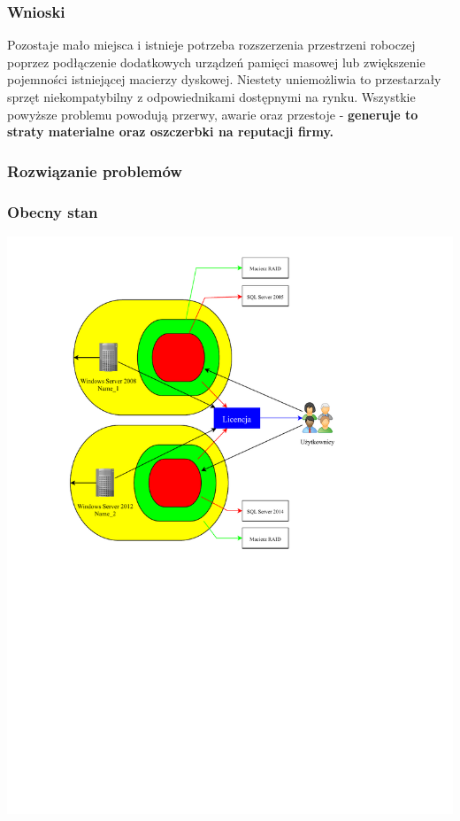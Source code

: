 \documentclass[a4paper, 12pt]{article}
\begin{document}
	  \subsubsection{Wnioski} 
	
			 	\hspace*{1cm} Pozostaje mało miejsca i istnieje potrzeba rozszerzenia przestrzeni roboczej poprzez podłączenie dodatkowych urządzeń pamięci masowej lub zwiększenie pojemności istniejącej macierzy dyskowej. Niestety uniemożliwia to przestarzały sprzęt niekompatybilny z odpowiednikami dostępnymi na rynku.\newline
			\hspace*{1cm}  Wszystkie powyższe problemu powodują przerwy, awarie oraz  przestoje - \textbf{generuje to straty materialne oraz oszczerbki na reputacji firmy.}
			
			\subsubsection{Rozwiązanie problemów}
				\subsubsection{Obecny stan}
			  \includegraphics[scale=0.7]{obecny_stan}
\end{document}
